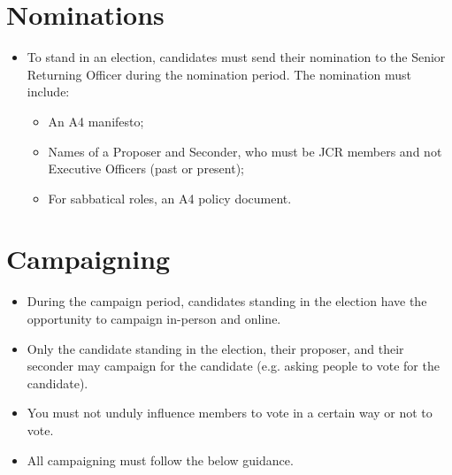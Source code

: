\documentclass[12pt]{article}
\begin{document}
    \section{Nominations}
    \begin{itemize}
        \item To stand in an election, candidates must send their nomination to the Senior Returning Officer during the nomination period. The nomination must include:
        \begin{itemize}
            \item An A4 manifesto;
            \item Names of a Proposer and Seconder, who must be JCR members and not Executive Officers (past or present);
            \item For sabbatical roles, an A4 policy document.
        \end{itemize}
    \end{itemize}

    \section{Campaigning}
    \begin{itemize}
        \item During the campaign period, candidates standing in the election have the opportunity to campaign in-person and online.
        \item Only the candidate standing in the election, their proposer, and their seconder may campaign for the candidate (e.g. asking people to vote for the candidate).
        \item You must not unduly influence members to vote in a certain way or not to vote.
        \item All campaigning must follow the below guidance.
    \end{itemize}
\end{document}
